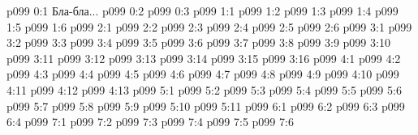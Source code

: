 \author{Мелхиседек}
\vs p099 0:1  Бла-бла...
\vs p099 0:2 
\vs p099 0:3 
\vs p099 1:1 
\vs p099 1:2 \pc 
\vs p099 1:3 \pc 
\vs p099 1:4 
\vs p099 1:5 
\vs p099 1:6 
\vs p099 2:1 
\vs p099 2:2 
\vs p099 2:3 \pc 
\vs p099 2:4 
\vs p099 2:5 \pc 
\vs p099 2:6 
\vs p099 3:1 
\vs p099 3:2 \pc 
\vs p099 3:3 
\vs p099 3:4 \pc 
\vs p099 3:5 
\vs p099 3:6 
\vs p099 3:7 \pc 
\vs p099 3:8 
\vs p099 3:9 \pc 
\vs p099 3:10 
\vs p099 3:11 
\vs p099 3:12 
\vs p099 3:13 
\vs p099 3:14 
\vs p099 3:15 \pc 
\vs p099 3:16 
\vs p099 4:1 
\vs p099 4:2 
\vs p099 4:3 \pc 
\vs p099 4:4 
\vs p099 4:5 
\vs p099 4:6 \pc 
\vs p099 4:7 \pc 
\vs p099 4:8 
\vs p099 4:9 
\vs p099 4:10 
\vs p099 4:11 
\vs p099 4:12 
\vs p099 4:13 \pc 
{}
\vs p099 5:1 
\vs p099 5:2 
\vs p099 5:3 \pc 
\vs p099 5:4 \pc 
\vs p099 5:5 
\vs p099 5:6 
\vs p099 5:7 
\vs p099 5:8 
\vs p099 5:9 
\vs p099 5:10 
\vs p099 5:11 \pc 
{}
\vs p099 6:1 
\vs p099 6:2 
\vs p099 6:3 
\vs p099 6:4 
\vs p099 7:1 
\vs p099 7:2 
\vs p099 7:3 
\vs p099 7:4 
\vs p099 7:5 
\vsetoff
\vs p099 7:6 
\quizlink
